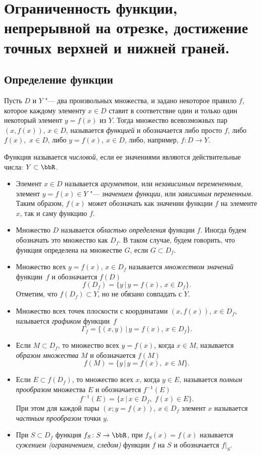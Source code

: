 \chapter{Ограниченность функции, непрерывной на отрезке, достижение точных верхней и нижней граней.}

\section{Определение функции}
\begin{defn}
Пусть $D$ и $Y$ "--- два произвольных множества, и задано некоторое правило $f$, которое каждому элементу $x\in D$ ставит в соответствие один и только один некоторый элемент $y=f(x)$ из $Y$. Тогда множество всевозможных пар $(x, f(x))$, $x\in D$, называется \textit{функцией} и обозначается либо просто $f$, либо $f(x),$ $x\in D$, либо $y=f(x),\ x\in D$, либо, например, $f\colon D \to Y$.
\end{defn}

Функция называется \textit{числовой}, если ее значениями являются действительные числа: $Y \subset \bbR$.
\begin{itemize}[wide, labelwidth=!, labelindent=0pt]
\item
Элемент $x \in D$ называется \textit{аргументом}, или \textit{независимым перемененным}, элемент $y=f(x) \in Y$ "--- \textit{значением функции}, или \textit{зависимым переменным}. Таким образом, $f(x)$ может обозначать как значении функции $f$ на элементе $x$, так и саму функцию $f$.
\item
Множество $D$ называется \textit{областью определения} функции $f$. Иногда будем обозначать это множество как $D_f$. В таком случае, будем говорить, что функция определена на множестве $G$, если $G \subset D_f$. 
\item
Множество всех $y=f(x)$, $x\in D_f$ называется \textit{множеством значений} функции~$f$ и обозначается $f(D)$ 
$$
f(D_f)=\{y \,\big|\, y=f(x),\, x\in D_f\}.
$$
Отметим, что $f(D_f) \subset Y$, но не обязано совпадать с $Y$.
\item 
Множество всех точек плоскости с координатами $(x, f(x))$, $x\in D_f$, называется \textit{графиком} функции~$f$ 
$$
\Gamma_f = \{(x,y) \,\big|\, y = f(x),\, x\in D_f\}.
$$
\item
Если $M \subset D_f$, то множество всех $y=f(x)$, когда $x\in M$, называется \textit{образом множества} $M$ и обозначается $f(M)$ $$f(M) = \{y\,\big|\, y=f(x),\; x\in M\}.$$
\item
Если $E \subset f(D_f)$, то множество всех $x$, когда $y\in E$, называется \textit{полным прообразом} множества $E$ и обозначается $f^{-1}(E)$ 
$$
f^{-1}(E)=\{x \,\big|\, x\in D_f,\; f(x)\in E\}.
$$
При этом для каждой пары $(x; y=f(x))$, $x\in D_f$ элемент $x$ называется \textit{частным прообразом} точки $y$.
\item
При $S\subset D_f$ функция $f_S\colon S\to\bbR$, при $f_S(x)=f(x)$ называется \textit{сужением (ограничением, следом)} функции $f$ на $S$ и обозначается $f\bigr|_S$.
\end{itemize}
 

